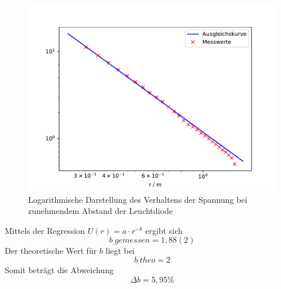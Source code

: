 \begin{figure}
\centering
\includegraphics[scale=0.5]{content/images/plot3.pdf}
\caption{Logarithmische Darstellung des Verhaltens der Spannung bei zunehmendem Abstand der Leuchtdiode}\label{fig:U5}
\end{figure}
Mittels der Regression $U(r)=a\cdot r^{-b}$ ergibt sich
\[
b_.{gemessen}=1,88(2)
\]
Der theoretische Wert für $b$ liegt bei 
\[
b_.{theo}=2
\]
Somit beträgt die Abweichung
\[
\Delta b = 5,95 \%
\]